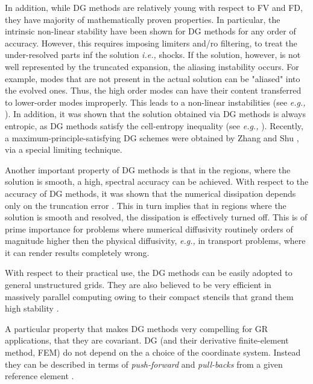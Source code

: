 In addition, while DG methods are relatively young with respect to FV and FD, they have majority of mathematically proven properties. In particular, the intrinsic non-linear stability have been shown for DG methods for any order of accuracy. However, this requires imposing limiters and/ro filtering, to treat the under-resolved parts inf the solution \textit{i.e.,} shocks. If the solution, however, is not well represented by the truncated expansion, the aliasing instability occurs. For example, modes that are not present in the actual solution can be "aliased" into the evolved ones. Thus, the high order modes can have their content transferred to lower-order modes improperly. This leads to a non-linear instabilities (see \textit{e.g.,} \cite{Boyd:2001}). In addition, it was shown that the solution obtained via DG methods is always entropic, as DG methods satisfy the cell-entropy inequality (see \textit{e.g.,} \cite{Cockburn:2003}). Recently, a maximum-principle-satisfying DG schemes were obtained by Zhang and Shu \cite{Zhang:2011}, via a special limiting technique. 

Another important property of DG methods is that in the regions, where the solution is smooth, a high, spectral accuracy can be achieved. With respect to the accuracy of DG methods, it was shown that the numerical dissipation depends only on the truncation error \cite{Cockburn:2003}. This in turn implies that in regions where the solution is smooth and resolved, the dissipation is effectively turned off. This is of prime importance for problems where numerical diffusivity routinely orders of magnitude higher then the physical diffusivity, \textit{e.g.,} in transport problems, where it can render results completely wrong. 

With respect to their practical use, the DG methods can be easily adopted to general unstructured grids. 
They are also believed to be very efficient in massively parallel computing owing to their compact stencils that grand them high stability \cite{Biswas:1994}. 

A particular property that makes DG methods very compelling for GR applications, that they are covariant. DG (and their derivative finite-element method, FEM) do not depend on the a choice of the coordinate system. Instead they can be described in terms of \textit{push-forward} and \textit{pull-backs} from a given reference element \cite{Meier:1999}. 

